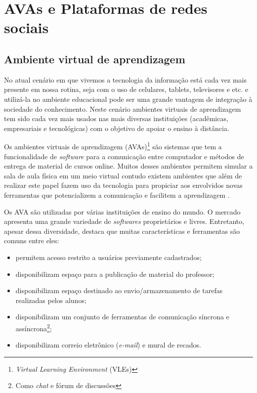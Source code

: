 \chapter{AVAs e Plataformas de redes sociais}
\label{avas-redes-sociais}
% 
\section{Ambiente virtual de aprendizagem}
\label{ava}
% 
No atual cenário em que vivemos a tecnologia da informação está cada vez mais presente em nossa rotina, seja com o uso de celulares, tablets, televisores e etc. e utilizá-la no ambiente educacional pode ser uma grande vantagem de integração à sociedade do conhecimento. Neste cenário ambientes virtuais de aprendizagem tem sido cada vez mais usados nas mais diversas instituições (acadêmicas, empresariais e tecnológicas) com o objetivo de apoiar o ensino à distância.

Os ambientes virtuais de aprendizagem (AVAs)\footnote{\textit{Virtual Learning Environment} (VLEs)} são sistemas que tem a funcionalidade de \textit{software} para a comunicação entre computador e métodos de entrega de material de cursos online. Muitos desses ambientes permitem simular a sala de aula física em um meio virtual contudo existem ambientes que além de realizar este papel fazem uso da tecnologia para propiciar aos envolvidos novas ferramentas que potencializem a comunicação e facilitem a aprendizagem \cite{schlemmer2005ambiente}.


Os AVA são utilizadas por várias instituições de ensino do mundo. O mercado apresenta uma grande variedade de \textit{softwares} proprietários e livres. Entretanto, apesar dessa diversidade,  destaca que muitas características e ferramentas são comuns entre eles:
\begin{itemize}
\item permitem acesso restrito a usuários previamente cadastrados;
\item disponibilizam espaço para a publicação de material do professor;
\item disponibilizam espaço destinado ao envio/armazenamento de tarefas realizadas pelos alunos;
\item disponibilizam um conjunto de ferramentas de comunicação síncrona e assíncrona\footnote{Como \textit{chat} e fórum de discussões};
\item disponibilizam correio eletrônico (\textit{e-mail}) e mural de recados.
\end{itemize}


